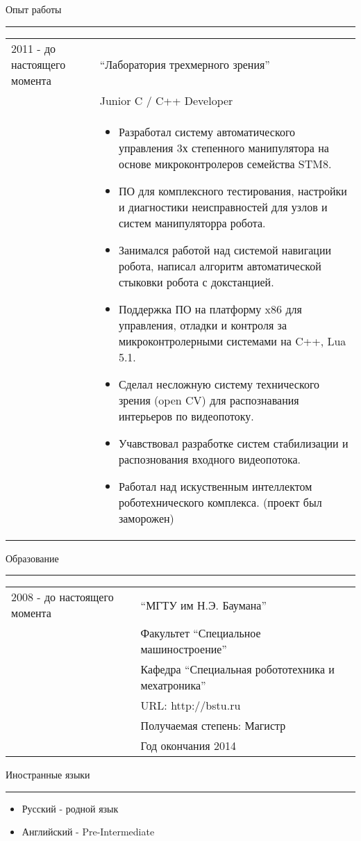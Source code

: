\documentclass{article}
\begin{document}
\rule{0pt}{1cm}
{\large Опыт работы }
\hrule \smallskip
    \begin{tabular}{p{25mm}|p{110mm}}
    2011 - до настоящего момента
        & ``Лаборатория трехмерного зрения'' \\
        & Junior C / C++ Developer \\
        &   \begin{itemize}
            \item Разработал систему автоматического управления 
                3х степенного манипулятора на основе микроконтролеров семейства STM8.
            \item ПО для комплексного тестирования, настройки и диагностики
                неисправностей для узлов и систем манипуляторра робота.
            \item Занимался работой над системой навигации робота,
                написал алгоритм автоматической стыковки робота с докстанцией.
            \item Поддержка ПО на платформу x86 для управления, 
                отладки и контроля за микроконтролерными системами на C++, Lua 5.1.
            \item Сделал несложную систему технического зрения (open CV) 
                для распознавания интерьеров по видеопотоку.
            \item Учавствовал разработке систем стабилизации и
                распознования входного видеопотока.
            \item Работал над искуственным интеллектом роботехнического комплекса.
                (проект был заморожен) 
            \end{itemize}
        \\
    \end{tabular}

\rule{0pt}{10mm}
{\large Образование}
\hrule \smallskip
    \begin{tabular}{p{25mm}|p{110mm}}
    2008 - до настоящего момента 
        & ``МГТУ им Н.Э. Баумана'' \\ 
        & Факультет ``Специальное машиностроение'' \\
        & Кафедра ``Специальная робототехника и мехатроника'' \\
        & URL: http://bstu.ru \\
        & Получаемая степень: Магистр \\
        & Год окончания 2014
    \end{tabular}

\rule{0pt}{1cm}
{\large Иностранные языки}
\hrule \smallskip
\begin{itemize}
    \item Русский    - родной язык
    \item Английский - Pre-Intermediate
\end{itemize}
\end{document}
